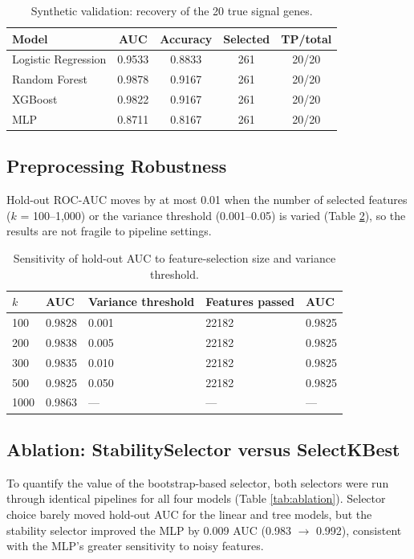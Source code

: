 \documentclass[12pt]{article}
\begin{document}
\begin{table}[htbp]
\centering
\caption{Synthetic validation: recovery of the 20 true signal genes.}
\label{tab:synthetic}
\begin{tabular}{lcccc}
\toprule
\textbf{Model} & \textbf{AUC} & \textbf{Accuracy} & \textbf{Selected} & \textbf{TP/total} \\
\midrule
Logistic Regression & 0.9533 & 0.8833 & 261 & 20/20 \\
Random Forest & 0.9878 & 0.9167 & 261 & 20/20 \\
XGBoost & 0.9822 & 0.9167 & 261 & 20/20 \\
MLP & 0.8711 & 0.8167 & 261 & 20/20 \\
\bottomrule
\end{tabular}
\end{table}

\subsection{Preprocessing Robustness}
Hold-out ROC-AUC moves by at most 0.01 when the number of selected features ($k$ = 100--1,000) or the variance threshold (0.001--0.05) is varied (Table \ref{tab:sensitivity}), so the results are not fragile to pipeline settings.

\begin{table}[htbp]
\centering
\caption{Sensitivity of hold-out AUC to feature-selection size and variance threshold.}
\label{tab:sensitivity}
\begin{tabular}{lllll}
\toprule
\textbf{$k$} & \textbf{AUC} & \textbf{Variance threshold} & \textbf{Features passed} & \textbf{AUC} \\
\midrule
100 & 0.9828 & 0.001 & 22182 & 0.9825 \\
200 & 0.9838 & 0.005 & 22182 & 0.9825 \\
300 & 0.9835 & 0.010 & 22182 & 0.9825 \\
500 & 0.9825 & 0.050 & 22182 & 0.9825 \\
1000 & 0.9863 & --- & --- & --- \\
\bottomrule
\end{tabular}
\end{table}

\subsection{Ablation: StabilitySelector versus SelectKBest}
\label{sec:ablation}
To quantify the value of the bootstrap-based selector, both selectors were run through identical pipelines for all four models (Table \ref{tab:ablation}). Selector choice barely moved hold-out AUC for the linear and tree models, but the stability selector improved the MLP by 0.009 AUC (0.983 $\rightarrow$ 0.992), consistent with the MLP's greater sensitivity to noisy features.
\end{document}
